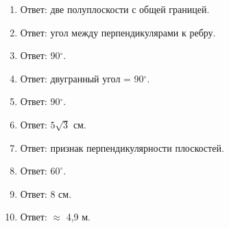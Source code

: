 \documentclass{umk-matematika}
\begin{document}
\begin{enumerate}
  \item Ответ: две полуплоскости с общей границей.
  \item Ответ: угол между перпендикулярами к ребру.
  \item Ответ: 90$^\circ$.
  \item Ответ: двугранный угол = 90$^\circ$.
  \item Ответ: 90$^\circ$.
  \item Ответ: $5\sqrt{3}$ см.
  \item Ответ: признак перпендикулярности плоскостей.
  \item Ответ: $60^\circ$.
  \item Ответ: 8 см.
  \item Ответ: $\approx$ 4,9 м.
\end{enumerate}
\end{document}
